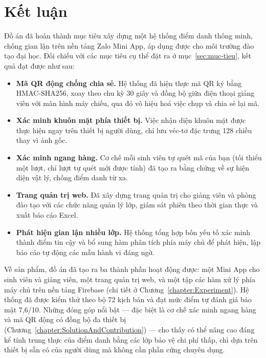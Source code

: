 \documentclass[../main.tex]{subfiles}
\begin{document}
\section{Kết luận}
\label{sec:ket-luan}

Đồ án đã hoàn thành mục tiêu xây dựng một hệ thống điểm danh thông minh, chống gian lận trên
nền tảng Zalo Mini App, áp dụng được cho môi trường đào tạo đại học. Đối chiếu với các mục
tiêu cụ thể đặt ra ở mục~\ref{sec:muc-tieu}, kết quả đạt được như sau:

\begin{itemize}[leftmargin=1.5em]
  \item \textbf{Mã QR động chống chia sẻ.} Hệ thống đã hiện thực mã QR ký bằng HMAC-SHA256,
  xoay theo chu kỳ 30 giây và đồng bộ giữa điện thoại giảng viên với màn hình máy chiếu, qua
  đó vô hiệu hoá việc chụp và chia sẻ lại mã.

  \item \textbf{Xác minh khuôn mặt phía thiết bị.} Việc nhận diện khuôn mặt được thực hiện
  ngay trên thiết bị người dùng, chỉ lưu véc-tơ đặc trưng 128 chiều thay vì ảnh gốc.

  \item \textbf{Xác minh ngang hàng.} Cơ chế mỗi sinh viên tự quét mã của bạn (tối thiểu một
  lượt, chỉ lượt tự quét mới được tính) đã tạo ra bằng chứng về sự hiện diện vật lý, chống điểm danh từ xa.

  \item \textbf{Trang quản trị web.} Đã xây dựng trang quản trị cho giảng viên và phòng đào
  tạo với các chức năng quản lý lớp, giám sát phiên theo thời gian thực và xuất báo cáo Excel.

  \item \textbf{Phát hiện gian lận nhiều lớp.} Hệ thống tổng hợp bốn yếu tố xác minh thành
  điểm tin cậy và bổ sung hàm phân tích phía máy chủ để phát hiện, lập báo cáo tự động các
  mẫu hành vi đáng ngờ.
\end{itemize}

Về sản phẩm, đồ án đã tạo ra ba thành phần hoạt động được: một Mini App cho sinh viên và giảng
viên, một trang quản trị web, và một tập các hàm xử lý phía máy chủ trên nền tảng Firebase
(chi tiết ở Chương~\ref{chapter:Experiment}). Hệ thống đã được kiểm thử theo bộ 72 kịch bản và
đạt mức điểm tự đánh giá bảo mật 7{,}6/10. Những đóng góp nổi bật --- đặc biệt là cơ chế xác
minh ngang hàng và mã QR động có đồng bộ đa thiết bị
(Chương~\ref{chapter:SolutionAndContribution}) --- cho thấy có thể nâng cao đáng kể tính trung
thực của điểm danh bằng các lớp bảo vệ chi phí thấp, chỉ dựa trên thiết bị sẵn có của người
dùng mà không cần phần cứng chuyên dụng.
\end{document}
